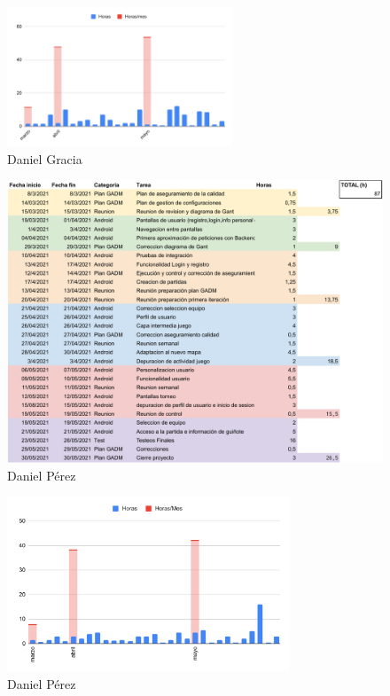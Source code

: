 \documentclass{article}
\begin{document}
\begin{figure}[h]
    \centering
    \includegraphics[width=0.6\textwidth]{../images/graficos/GRACIA}
    \caption{Daniel Gracia}
\end{figure}

\begin{figure}[h]
    \centering
    \includegraphics[width=\textwidth]{../images/horasTrabajadas/daniel-perez.pdf}
    \caption{Daniel Pérez}
\end{figure}

\begin{figure}[h]
    \centering
    \includegraphics[width=0.75\textwidth]{../images/graficos/PEREZ}
    \caption{Daniel Pérez}
\end{figure}
\end{document}
